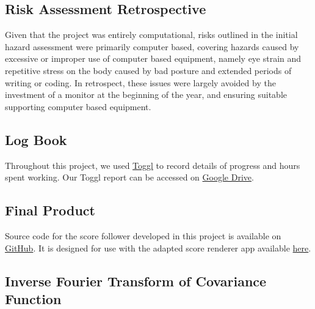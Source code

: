 \appendix
\begin{appendices}
\chapter{}
\vspace{-1.8cm}
\section{Risk Assessment Retrospective}

Given that the project was entirely computational, risks outlined in the initial hazard assessment were primarily computer based, covering hazards caused by excessive or improper use of computer based equipment, namely eye strain and repetitive stress on the body caused by bad posture and extended periods of writing or coding. In retrospect, these issues were largely avoided by the investment of a monitor at the beginning of the year, and ensuring suitable supporting computer based equipment. 


\section{Log Book}

Throughout this project, we used \href{https://toggl.com/}{Toggl} to record details of progress and hours spent working. Our Toggl report can be accessed on \href{https://drive.google.com/file/d/1Inj8odZ7XiuMx6RSc6DPxtUZ8Bg0fgdk/view?usp=sharing}{Google Drive}. %


\section{Final Product}

Source code for the score follower developed in this project is available on \href{https://github.com/josephinecowley/Score-follower}{GitHub}. It is designed for use with the adapted score renderer app available \href{https://github.com/josephinecowley/Score-follower/releases/tag/Release}{here}. %


\section{Inverse Fourier Transform of Covariance Function}{\label{appendix:iFT}}


\end{appendices}
